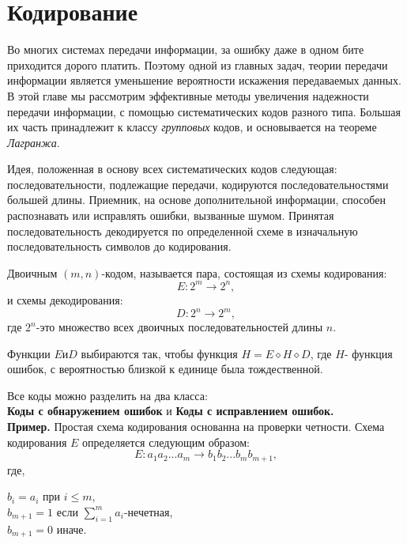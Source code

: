\section{Кодирование}
Во многих системах передачи информации, за ошибку даже в одном бите приходится дорого платить. Поэтому одной из главных задач, теории передачи информации является уменьшение вероятности искажения передаваемых данных.
В этой главе мы рассмотрим эффективные методы увеличения надежности передачи информации, с помощью систематических кодов разного типа. Большая их часть принадлежит к классу \textit{групповых} кодов, и  основывается на теореме \textit{Лагранжа}. 

Идея, положенная в основу всех систематических кодов следующая:
последовательности, подлежащие передачи, кодируются последовательностями большей длины. Приемник, на основе дополнительной информации, способен распознавать или исправлять ошибки, вызванные шумом.
Принятая последовательность декодируется по определенной схеме в изначальную последовательность символов до кодирования.
\begin{Def}
Двоичным $(m,n)$-кодом, называется пара, состоящая из схемы кодирования: $$E:2^m\rightarrow 2^n,$$
и схемы декодирования:
$$D:2^n\rightarrow 2^m,$$
где $2^n$-это множество всех двоичных последовательностей длины $n$. 
\end{Def}
Функции $E и D$ выбираются так, чтобы функция $H=E\diamond H\diamond D$, где $H$- функция ошибок, с вероятностью близкой к единице была тождественной.

Все коды можно разделить на два класса:\\ \textbf{Коды с обнаружением ошибок} и \textbf{Коды с исправлением ошибок.}
\\

\textbf{Пример.} Простая схема кодирования основанна на проверки четности.
Схема кодирования $E$ определяется следующим образом:
$$E:a_1 a_2...a_m \rightarrow b_1 b_2...b_m b_{m+1},$$
где,
\begin{center}

$b_i=a_i$ при $i\leq m$, \\
$b_{m+1}=1$ если $\sum\limits_{i=1}^m a_i$-нечетная, \\
$b_{m+1}=0$ иначе.

\end{center}